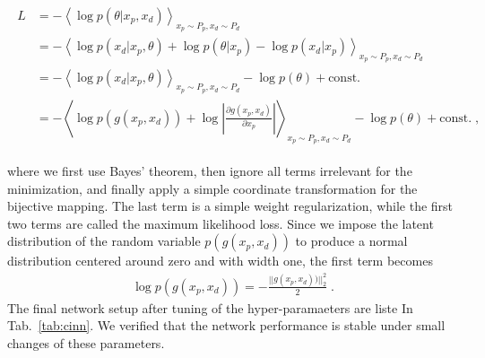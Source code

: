 \begin{align}
\begin{split}
L &= -  \left\langle \log p(\theta |x_p,x_d) \right\rangle_{x_p\sim P_p,x_d \sim P_d} \\
&= -  \left\langle \log p(x_d |x_p, \theta) + \log p(\theta|x_p) - \log p(x_d|x_p)\right\rangle_{x_p\sim P_p,x_d \sim P_d} \\
&= - \left\langle  \log p(x_d |x_p,\theta) \right\rangle_{x_p\sim P_p,x_d \sim P_d}  - \log p(\theta) + \text{const.} \\
&= - \left\langle \log p(g(x_p,x_d)) + \log \left| \frac{\partial g(x_p,x_d)}{\partial x_p} \right| \right\rangle_{x_p\sim P_p,x_d \sim P_d}  - \log p(\theta) + \text{const.} \; ,
\end{split}
\label{eq:loss}
\end{align}

where we first use Bayes' theorem, then ignore all terms irrelevant
for the minimization, and finally apply a simple coordinate transformation
for the bijective mapping. The last term is a simple weight
regularization, while the first two terms are called the maximum
likelihood loss. Since we impose the latent distribution of the random
variable $p(g(x_p, x_d))$ to produce a normal distribution centered
around zero and with width one, the first term becomes
%
\begin{align}
  \log p(g(x_p,x_d)) = -\frac{||g(x_p, x_d))||_2^2}{2} \; .
\end{align}
%
The final network setup after tuning of the hyper-paramaeters are liste In Tab.~\ref{tab:cinn}. We verified that the network performance is stable under small changes of these parameters.

